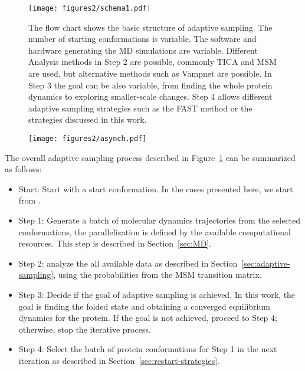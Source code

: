 \begin{figure}[h]
  \centering
  \texttt{[image: figures2/schema1.pdf]}
  \caption{The flow chart shows the basic structure of adaptive sampling. The
  number of starting conformations is variable. The software and hardware
  generating the MD simulations are variable. Different Analysis methods in Step 2
  are possible, commonly TICA \cite{TICA1-perez2013, TICA2-schwantes2013} and
  MSM \cite{prinz2011markov} are used, but alternative methods such as Vampnet \cite{Mardt2018}
  are possible. In Step 3 the goal can be also variable, from finding the whole protein
  dynamics to exploring smaller-scale changes. Step 4 allows different adaptive
  sampling strategies such as the FAST method \cite{FAST} or the strategies
  discussed in this work.}
  \label{fig:schema}
\end{figure}

\begin{figure}[h]
  \centering
  \texttt{[image: figures2/asynch.pdf]}
  \caption{}
  \label{fig:asynch}
\end{figure}

The overall adaptive sampling process described in Figure~\ref{fig:schema} can be summarized as follows:
\begin{itemize}
\item Start: Start with a start conformation. In the cases presented here, we
start from .
\item Step 1: Generate a batch of molecular dynamics trajectories from the
selected conformations, the parallelization is defined by the available
computational resources. This step is described in Section~\ref{sec:MD}.
\item Step 2: analyze the all available data as described in
Section~\ref{sec:adaptive-sampling}, using the probabilities from the MSM
transition matrix.
\item Step 3: Decide if the goal of adaptive sampling is achieved. In this
work, the goal is finding the folded state and obtaining a converged equilibrium
dynamics for the protein. If the goal is not achieved, proceed to Step 4;
otherwise, stop the iterative process.  
\item Step 4: Select the batch of protein conformations for Step 1 in the next
iteration as described in Section~\ref{sec:restart-strategies}.
\end{itemize}

